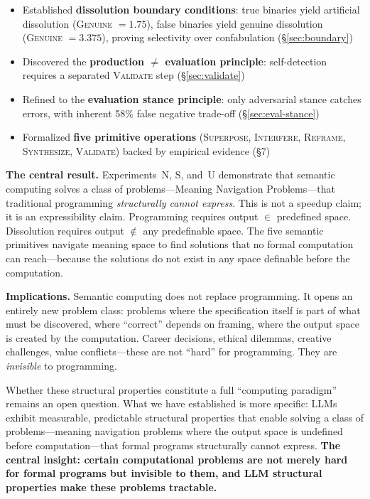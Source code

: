 \documentclass[11pt,a4paper]{article}
\begin{document}
\begin{itemize}[leftmargin=*]
\item Established \textbf{dissolution boundary conditions}: true binaries yield artificial dissolution (\textsc{Genuine} $= 1.75$), false binaries yield genuine dissolution (\textsc{Genuine} $= 3.375$), proving selectivity over confabulation (\S\ref{sec:boundary})
\item Discovered the \textbf{production $\neq$ evaluation principle}: self-detection requires a separated \textsc{Validate} step (\S\ref{sec:validate})
\item Refined to the \textbf{evaluation stance principle}: only adversarial stance catches errors, with inherent 58\% false negative trade-off (\S\ref{sec:eval-stance})
\item Formalized \textbf{five primitive operations} (\textsc{Superpose}, \textsc{Interfere}, \textsc{Reframe}, \textsc{Synthesize}, \textsc{Validate}) backed by empirical evidence (\S7)
\end{itemize}

\textbf{The central result.} Experiments~N, S, and~U demonstrate that semantic computing solves a class of problems---Meaning Navigation Problems---that traditional programming \emph{structurally cannot express}. This is not a speedup claim; it is an expressibility claim. Programming requires output $\in$ predefined space. Dissolution requires output $\notin$ any predefinable space. The five semantic primitives navigate meaning space to find solutions that no formal computation can reach---because the solutions do not exist in any space definable before the computation.

\textbf{Implications.} Semantic computing does not replace programming. It opens an entirely new problem class: problems where the specification itself is part of what must be discovered, where ``correct'' depends on framing, where the output space is created by the computation. Career decisions, ethical dilemmas, creative challenges, value conflicts---these are not ``hard'' for programming. They are \emph{invisible} to programming.

Whether these structural properties constitute a full ``computing paradigm'' remains an open question. What we have established is more specific: LLMs exhibit measurable, predictable structural properties that enable solving a class of problems---meaning navigation problems where the output space is undefined before computation---that formal programs structurally cannot express. \textbf{The central insight: certain computational problems are not merely hard for formal programs but invisible to them, and LLM structural properties make these problems tractable.}
\end{document}
